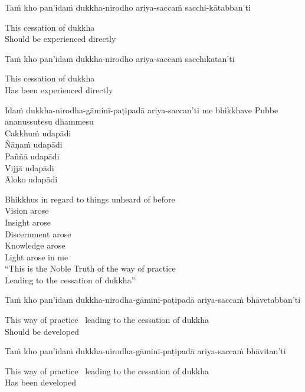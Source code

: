 Taṁ kho pan’idaṁ dukkha-nirodho ariya-saccaṁ sacchi-kātabban’ti

\begin{cprenglish}
  This cessation of dukkha\\
  Should be experienced directly
\end{cprenglish}

Taṁ kho pan’idaṁ dukkha-nirodho ariya-saccaṁ sacchikatan’ti

\begin{cprenglish}
  This cessation of dukkha\\
  Has been experienced directly
\end{cprenglish}

Idaṁ dukkha-nirodha-gāminī-paṭipadā ariya-saccan’ti me bhikkhave
Pubbe ananussutesu dhammesu\\
Cakkhuṁ udapādi\\
Ñāṇaṁ udapādi\\
Paññā udapādi\\
Vijjā udapādi\\
Āloko udapādi

\begin{cprenglish}
  Bhikkhus in regard to things unheard of before\\
  Vision arose\\
  Insight arose\\
  Discernment arose\\
  Knowledge arose\\
  Light arose in me\\
  “This is the Noble Truth of the way of practice\\
  Leading to the cessation of dukkha”
\end{cprenglish}

Taṁ kho pan’idaṁ dukkha-nirodha-gāminī-paṭipadā ariya-saccaṁ bhāvetabban’ti

\begin{cprenglish}
  This way of practice \breathmark\ leading to the cessation of dukkha\\
  Should be developed
\end{cprenglish}

Taṁ kho pan’idaṁ dukkha-nirodha-gāminī-paṭipadā ariya-saccaṁ bhāvitan’ti

\begin{cprenglish}
  This way of practice \breathmark\ leading to the cessation of dukkha\\
  Has been developed
\end{cprenglish}


